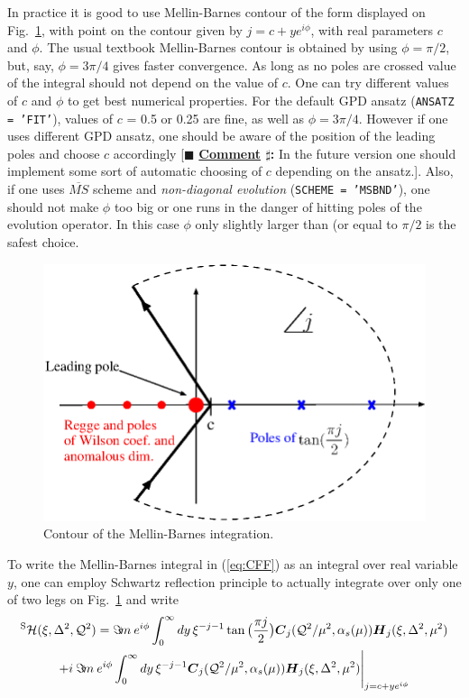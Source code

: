 \documentclass[12pt]{article}
\newcounter{comment}
\newcommand{\comminline}[1]{{%
\refstepcounter{comment}%
\ttfamily\small[$\blacksquare$ \textbf{\underline{Comment}
$\sharp$\thecomment:} #1]}}
\begin{document}
In practice it is good to use Mellin-Barnes contour of the form displayed
on Fig.~\ref{fig:MellinBarnes}, with point on the contour given
by $j=c+ye^{i\phi}$, with real parameters $c$ and $\phi$.
The usual textbook Mellin-Barnes contour is obtained by
using $\phi = \pi/2$, but, say, $\phi = 3\pi /4$ gives faster
convergence. As long as no poles are crossed value of the
integral should not depend on the value of $c$. One can
try different values of $c$ and $\phi$ to get best numerical
properties. 
For the default GPD ansatz (\texttt{ANSATZ = 'FIT'}), values of  $c$ = 0.5 or 0.25 are
fine, as well as $\phi = 3\pi/4$. However if one uses different GPD ansatz, one should
be aware of the position of the leading poles and choose $c$ accordingly 
\comminline{In the
future version one should implement some sort of automatic choosing of $c$ depending
on the ansatz.}. Also, if
one uses $\overline{MS}$ scheme and \emph{non-diagonal evolution} (\texttt{SCHEME = 'MSBND'}),
one should not make $\phi$ too big or one runs in the danger of hitting poles of
the evolution operator. In this case $\phi$ only slightly larger than (or
equal to $\pi/2$ is the safest choice.

\begin{figure}
\begin{center}
\includegraphics[scale=1.0]{MellinBarnes}
\end{center}
\caption{Contour of the Mellin-Barnes integration.}
\label{fig:MellinBarnes}
\end{figure}


To write the Mellin-Barnes integral in (\ref{eq:CFF}) as an integral
over real variable $y$, one can employ Schwartz reflection principle to
actually integrate over only one of two legs on Fig.~\ref{fig:MellinBarnes}
and write
\begin{multline}
{^{\rm S}{\cal H}}(\xi,\Delta^2,{\cal Q}^2) =
\Im\! m\:  e^{i\phi} 
\int_{0}^{\infty} dy \, \xi^{-j-1}
\tan\big(\frac{\pi j}{2}\big)
\mbox{\boldmath $C$}_{j}({\cal Q}^2/\mu^2,\alpha_s(\mu)) 
\mbox{\boldmath $H$}_{j} (\xi,\Delta^2,\mu^2) \\
+ i\: \Im\! m\:  e^{i\phi} 
\int_{0}^{\infty} dy \, \xi^{-j-1}
\mbox{\boldmath $C$}_{j}({\cal Q}^2/\mu^2,\alpha_s(\mu)) 
\mbox{\boldmath $H$}_{j} (\xi,\Delta^2,\mu^2) 
\Bigg|_{j = c + y e^{i\phi}}
\label{<Hformula>}
\end{multline}
\end{document}
